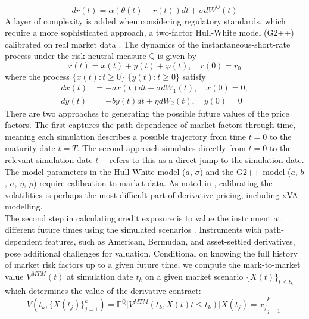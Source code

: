    \begin{equation}\label{eq:hull_white}
        dr(t) = \alpha(\theta(t) -  r(t))dt + \sigma dW^\mathbb{Q}(t)
    \end{equation}
    \noindent 
    A layer of complexity is added when considering regulatory standards, which require a more sophisticated approach, a two-factor Hull-White model (G2++) calibrated on real market data \cite{silotto2021everything}. The dynamics of the instantaneous-short-rate process under the risk neutral measure $\mathbb{Q}$ is given by \\
    \begin{equation}
        r(t) = x(t) + y(t) + \varphi (t), \quad r(0) = r_0
    \end{equation}
    \noindent
    where the process $\{ x(t) : t \ge 0\}$ $\{ y(t) : t \ge 0\}$ satisfy 
    \begin{align}
        dx(t) &= -ax(t)dt + \sigma dW_1(t), \quad x(0) = 0, \\
        dy(t) &= -by(t)dt + \eta dW_2(t), \quad y(0) =0  
    \end{align}
    There are two approaches to generating the possible future values of the price factors. The first captures the path dependence of market factors through time, meaning each simulation describes a possible trajectory from time $t=0$ to the maturity date $t=T$. The second approach simulates directly from $t=0$ to the relevant simulation date $t$—\cite{zhu2007guide} refers to this as a direct jump to the simulation date. \\

    \noindent
    The model parameters in the Hull-White model ($a$, $\sigma$) and the G2++ model ($a$, $b$, $\sigma$, $\eta$, $\rho$) require calibration to market data. As noted in \cite{Tsuchiya_2019}, calibrating the volatilities is perhaps the most difficult part of derivative pricing, including xVA modelling.\\

    \noindent
  The second step in calculating credit exposure is to value the instrument at different future times using the simulated scenarios \cite{zhu2007guide}. Instruments with path-dependent features, such as American, Bermudan, and asset-settled derivatives, pose additional challenges for valuation. Conditional on knowing the full history of market risk factors up to a given future time, we compute the mark-to-market value $V^{MTM}(t)$ at simulation date $t_k$ on a given market scenario $\{X(t)\}_{t \leq t_k}$ which determines the value of the derivative contract:  
    \begin{equation}\label{eq:PricingEnq}
    V(t_k,\{X(t_j)\}_{j=1}^{k}) = \mathbb{E}^{\mathbb{Q}} \Big[ V^{MTM}(t_k,{X(t)}{t \leq t_k}) \Big |{ X(t_j) = x_j }_{j=1}^{k} \Big]
    \end{equation}
    

